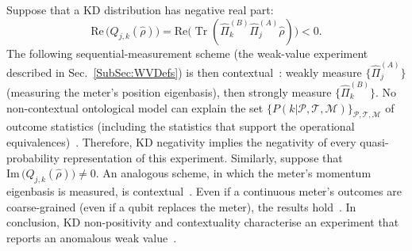 \documentclass[%
 reprint,
superscriptaddress,
nofootinbib,
bibnotes,
 amsmath,amssymb,
 aps,
]{revtex4-1}
\theoremstyle{plain}
\DeclareMathOperator{\Tr}{Tr}
\begin{document}
 
Suppose that 
a KD distribution has negative real part:
 \begin{equation}\label{eq:work_KD_2}
    \textrm{Re}\,  \bm{(} Q_{j,k}(\hat{\rho}) \bm{)} 
    = \textrm{Re} \bm{(} \Tr( \hat{\Pi}_k^{(B)} \hat{\Pi}_j^{(A)} \hat{\rho} ) \bm{)} <0 .
\end{equation}
The following sequential-measurement scheme (the weak-value experiment described in Sec.~\ref{SubSec:WVDefs}) is then contextual~\cite{Pusey14, kunjwal2019anomalous}:
weakly measure $\{ \hat{\Pi}_j^{(A)} \}$ 
(measuring the meter's position eigenbasis),  
then strongly measure $\{\hat{\Pi}_k^{(B)}\}$.
No non-contextual ontological model can explain the set $\{P(k|{\mathscr{P}},{\mathscr{T}},{\mathscr{M}})\}_{{\mathscr{P}},{\mathscr{T}},{\mathscr{M}}}$ of outcome statistics 
(including the statistics that
support the operational equivalences)~\cite{Pusey14}. 
Therefore, 
KD negativity implies the negativity of every quasi-probability representation of this experiment. 
Similarly, suppose that $\textrm{Im}\, \bm{(} Q_{j,k}(\hat{\rho}) \bm{)} \neq0$. An analogous scheme, in which the meter's momentum eigenbasis is measured, is contextual~\cite{kunjwal2019anomalous}. 
Even if a continuous meter's outcomes are coarse-grained
(even if a qubit replaces the meter), the results hold~\cite{kunjwal2019anomalous}.  
In conclusion, KD non-positivity and contextuality characterise an experiment that reports an anomalous weak value~\cite{Pusey14, kunjwal2019anomalous}.
\end{document}
